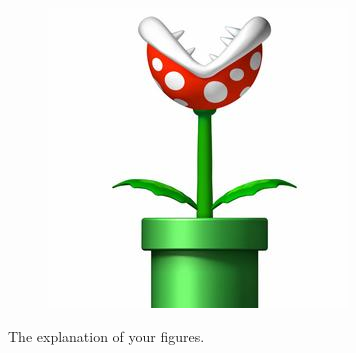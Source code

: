 \begin{figure}[h!]
\begin{subfigure}{.43\textwidth}
			\includegraphics[width=\linewidth]{1-Esparcimiento/figs/plant}
	\end{subfigure}%
	\vspace*{-.25cm}
	\caption{The explanation of your figures. \blindtext}	\label{fig:Main}	
	\end{figure}	
				
\Blindtext
